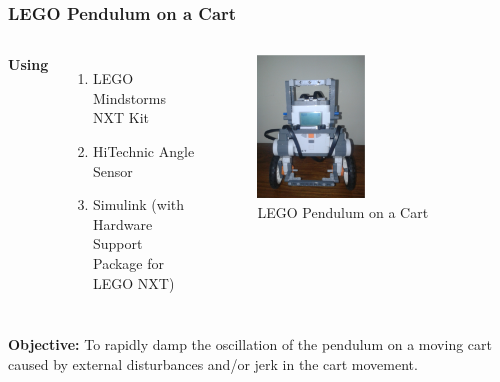 \documentclass[aspectratio=169]{beamer}
\begin{document}
\begin{frame}
\frametitle{LEGO Pendulum on a Cart}
\begin{columns}[c] %

\textbf{Using}
\begin{enumerate}
\item LEGO Mindstorms NXT Kit
\item HiTechnic Angle Sensor
\item Simulink (with Hardware Support Package for LEGO NXT)
\end{enumerate}

\begin{figure}
	\includegraphics[width=0.5\textwidth]{legoBot.eps}
	\caption{LEGO Pendulum on a Cart}
\end{figure}
\end{columns}
\textbf{Objective:} To rapidly damp the oscillation of the pendulum on a moving cart caused by external disturbances and/or jerk in the cart movement.
\end{frame}

\end{document}
